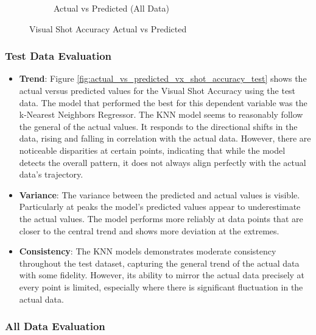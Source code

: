 \begin{figure}[htbp]
\begin{subfigure}[b]{0.49\textwidth}
        \caption{Actual vs Predicted (All Data)}
        \label{fig:actual_vs_predicted_vx_shot_accuracy_all_data}
    \end{subfigure}
    \caption{Visual Shot Accuracy Actual vs Predicted}
    \label{fig:visual_shot_accuracy_comparison}
\end{figure}

\subsubsection*{Test Data Evaluation}

\begin{itemize}
    \item \textbf{Trend}: Figure \ref{fig:actual_vs_predicted_vx_shot_accuracy_test} shows the actual versus predicted values for the Visual Shot Accuracy using the test data. The model that performed 
    the best for this dependent variable was the k-Nearest Neighbors Regressor. The KNN model seems to reasonably follow the general of the actual values. It responds to the directional shifts in the data,
    rising and falling in correlation with the actual data. However, there are noticeable disparities at certain points, indicating that while the model detects the overall pattern, it does not always align
    perfectly with the actual data's trajectory.       
    \item \textbf{Variance}: The variance between the predicted and actual values is visible. Particularly at peaks the model's predicted values appear to underestimate the actual values. The model performs 
    more reliably at data points that are closer to the central trend and shows more deviation at the extremes.    
    \item \textbf{Consistency}: The KNN models demonstrates moderate consistency throughout the test dataset, capturing the general trend of the actual data with some fidelity. However, its ability to 
    mirror the actual data precisely at every point is limited, especially where there is significant fluctuation in the actual data.
    
\end{itemize}

\subsubsection*{All Data Evaluation}

